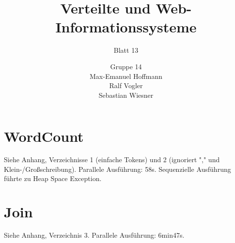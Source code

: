 \documentclass[11pt,a4paper]{scrartcl}
\begin{document}
\author{Gruppe 14\\Max-Emanuel Hoffmann\\Ralf Vogler\\Sebastian Wiesner}
\title{Verteilte und Web-Informationssysteme}
\subtitle{Blatt 13}

\maketitle

\section{WordCount}
Siehe Anhang, Verzeichnisse 1 (einfache Tokens) und 2 (ignoriert "," und Klein-/Großschreibung).
Parallele Ausführung: 58s.
Sequenzielle Ausführung führte zu Heap Space Exception.

\section{Join}
Siehe Anhang, Verzeichnis 3.
Parallele Ausführung: 6min47s.
\end{document}
